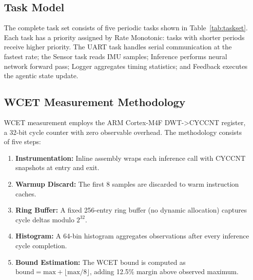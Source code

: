 \documentclass[conference]{IEEEtran}
\begin{document}
\subsection{Task Model}

The complete task set consists of five periodic tasks shown in Table~\ref{tab:taskset}. Each task has a priority assigned by Rate Monotonic: tasks with shorter periods receive higher priority. The UART task handles serial communication at the fastest rate; the Sensor task reads IMU samples; Inference performs neural network forward pass; Logger aggregates timing statistics; and Feedback executes the agentic state update.

\begin{table}[t]
\centering
\caption{Task Set Definition}
\label{tab:taskset}
\end{table}

\subsection{WCET Measurement Methodology}

WCET measurement employs the ARM Cortex-M4F DWT->CYCCNT register, a 32-bit cycle counter with zero observable overhead. The methodology consists of five steps:

\begin{enumerate}
\item \textbf{Instrumentation:} Inline assembly wraps each inference call with CYCCNT snapshots at entry and exit.
\item \textbf{Warmup Discard:} The first 8 samples are discarded to warm instruction caches.
\item \textbf{Ring Buffer:} A fixed 256-entry ring buffer (no dynamic allocation) captures cycle deltas modulo $2^{32}$.
\item \textbf{Histogram:} A 64-bin histogram aggregates observations after every inference cycle completion.
\item \textbf{Bound Estimation:} The WCET bound is computed as $\text{bound} = \text{max} + \lfloor \text{max} / 8 \rfloor$, adding 12.5\% margin above observed maximum.
\end{enumerate}
\end{document}
